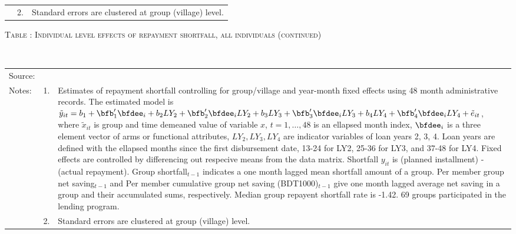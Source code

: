 \begin{minipage}[t]{14cm}
\begin{tabular}{>{\hfill\scriptsize}p{1cm}<{}>{\hfill\scriptsize}p{.25cm}<{}>{\scriptsize}p{12cm}<{\hfill}}
& 2. & Standard errors are clustered at group (village) level.
\end{tabular}
\end{minipage}

\addtocounter{table}{-1}
\hspace{-1cm}\begin{minipage}[t]{14cm}
\hfil\textsc{\normalsize Table \thetable: Individual level effects of repayment shortfall, all individuals (continued)\label{tab shortfall indiv3}}\\
\setlength{\tabcolsep}{1pt}
\setlength{\baselineskip}{8pt}
\renewcommand{\arraystretch}{.6}
\hfil{}\\
\renewcommand{\arraystretch}{.8}
\setlength{\tabcolsep}{1pt}
\begin{tabular}{>{\hfill\scriptsize}p{1cm}<{}>{\hfill\scriptsize}p{.25cm}<{}>{\scriptsize}p{12cm}<{\hfill}}
Source:& \multicolumn{2}{l}{\scriptsize Estimated with GUK administrative data.}\\
Notes: & 1. & Estimates of repayment shortfall controlling for group/village and year-month fixed effects using 48 month administrative records. The estimated model is $\tilde{y}_{it}=b_{1}+\bfb'_{1}\bfdee_{i}+b_{2}LY_{2}+\bfb'_{2}\bfdee_{i}LY_{2}+b_{3}LY_{3}+\bfb'_{3}\bfdee_{i}LY_{3}+b_{4}LY_{4}+\bfb'_{4}\bfdee_{i}LY_{4}+\tilde{e}_{it}$, where $\tilde{x}_{it}$ is group and time demeaned value of variable $x$, $t=1,\dots, 48$ is an ellapsed month index, $\bfdee_{i}$ is a three element vector of arms or functional attributes, $LY_{2}, LY_{3}, LY_{4}$ are indicator variables of loan years 2, 3, 4. Loan years are defined with the ellapsed months since the first disbursement date, 13-24 for \textsf{LY2}, 25-36 for \textsf{LY3}, and 37-48 for \textsf{LY4}. Fixed effects are controlled by differencing out respecive means from the data matrix. Shortfall $y_{it}$ is (planned installment) - (actual repayment). \textsf{Group shortfall}$_{t-1}$ indicates a one month lagged mean shortfall amount of a group. \textsf{Per member group net saving}$_{t-1}$ and \textsf{Per member cumulative group net saving (BDT1000)}$_{t-1}$ give one month lagged average net saving in a group and their accumulated sums, respectively. Median group repayent shortfall rate is -1.42. 69 groups participated in the lending program. \\
& 2. & Standard errors are clustered at group (village) level.
\end{tabular}
\end{minipage}

